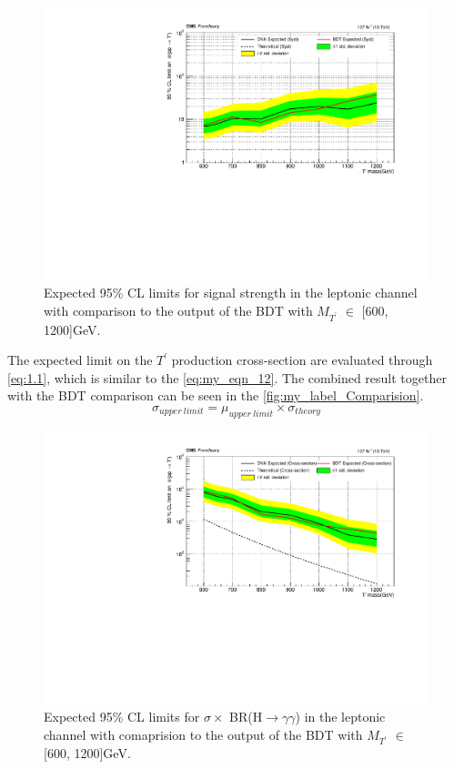 \begin{figure}[H]
    \centering
    \includegraphics[scale=0.8]{figure_4/muALL_Plot_600-1200_.pdf}
    \caption{Expected 95\% CL limits for signal strength in the leptonic channel with comparison to the output of the BDT with $M_{T^'}$ $\in$ [600, 1200]GeV.}
    \label{fig:my_label_limit}
\end{figure}

The expected limit on the ${T^'}$ production cross-section are evaluated through \autoref{eq:1.1}, which is similar to the \autoref{eq:my_eqn_12}. The combined result together with the BDT comparison can be seen in the \autoref{fig:my_label_Comparision}.
\begin{equation} \label{eq:1.1}
    \sigma_{upper\ limit} = \mu_{upper\ limit} \times \sigma_{theory}
\end{equation}


\begin{figure}[H]
    \centering
    \includegraphics[scale=0.8]{figure_4/muALL_Plot_600-1200_with_cross_Section_comparision.pdf}
    \caption{Expected 95\% CL limits for $\sigma \times$ BR(H$\longrightarrow$$\gamma\gamma$)  in the leptonic channel with comaprision to the output of the BDT with $M_{T^'}$ $\in$ [600, 1200]GeV.}
    \label{fig:my_label_Comparision}
\end{figure}






